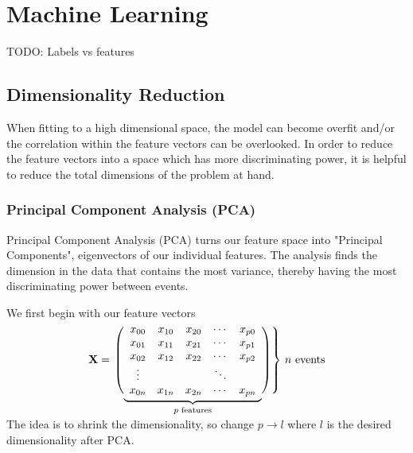 
\chapter{Machine Learning}

TODO: Labels vs features

\section{Dimensionality Reduction}\label{dim_red}
When fitting to a high dimensional space, the model can become overfit and/or the correlation within the feature vectors can be overlooked. In order to reduce the feature vectors into a space which has more discriminating power, it is helpful to reduce the total dimensions of the problem at hand.
\subsection{Principal Component Analysis (PCA)}
Principal Component Analysis (PCA) turns our feature space into "Principal Components", eigenvectors of our individual features. The analysis finds the dimension in the data that contains the most variance, thereby having the most discriminating power between events.

We first begin with our feature vectors
$$\mathbf{X} = \left.\left( 
                  \vphantom{\begin{array}{c}1\\1\\1\\1\\1\end{array}}
                  \smash{\underbrace{
                      \begin{array}{ccccc}
                             x_{00}&x_{10}&x_{20}&\cdots &x_{p0}\\
                             x_{01}&x_{11}&x_{21}&\cdots &x_{p1}\\
                             x_{02}&x_{12}&x_{22}&\cdots &x_{p2}\\
                             \vdots&&&\ddots&\\
                             x_{0n}&x_{1n}&x_{2n}&\cdots &x_{pn}
                      \end{array}
                      }_{p\text{ features}}}
              \right)\right\}
              \,n\text{ events}
$$\\

The idea is to shrink the dimensionality, so change $p\rightarrow l$ where $l$ is the desired dimensionality after PCA. 

